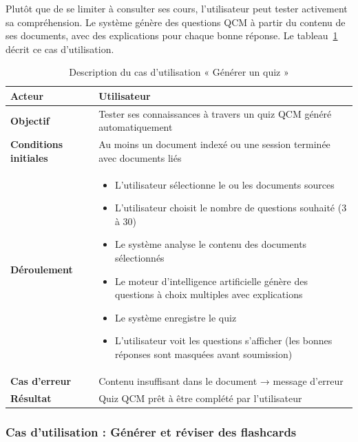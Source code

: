 Plutôt que de se limiter à consulter ses cours, l'utilisateur peut tester activement sa compréhension. Le système génère des questions QCM à partir du contenu de ses documents, avec des explications pour chaque bonne réponse. Le tableau~\ref{tab:uc_quiz} décrit ce cas d'utilisation.

\begin{table}[H]
\centering
\renewcommand{\arraystretch}{1.2}
\begin{tabular}{|p{4cm}|p{10cm}|}
\hline
\textbf{Acteur} & Utilisateur \\ \hline
\textbf{Objectif} & Tester ses connaissances à travers un quiz QCM généré
                    automatiquement \\ \hline
\textbf{Conditions initiales} & Au moins un document indexé ou une session
                                 terminée avec documents liés \\ \hline
\textbf{Déroulement} &
\begin{itemize}
    \item L'utilisateur sélectionne le ou les documents sources
    \item L'utilisateur choisit le nombre de questions souhaité (3 à 30)
    \item Le système analyse le contenu des documents sélectionnés
    \item Le moteur d'intelligence artificielle génère des questions à choix multiples avec explications
    \item Le système enregistre le quiz
    \item L'utilisateur voit les questions s'afficher (les bonnes réponses sont masquées avant soumission)
\end{itemize} \\ \hline
\textbf{Cas d'erreur} & Contenu insuffisant dans le document →
                        message d'erreur \\ \hline
\textbf{Résultat} & Quiz QCM prêt à être complété par l'utilisateur \\ \hline
\end{tabular}
\caption{Description du cas d'utilisation « Générer un quiz »}
\label{tab:uc_quiz}
\end{table}

\subsubsection{Cas d'utilisation : Générer et réviser des flashcards}


